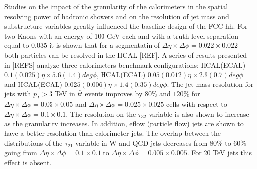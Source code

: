 Studies on the impact of the granularity of the calorimeters in the spatial resolving power of hadronic showers and on the resolution of jet mass and substructure variables greatly influenced the baseline design of the FCC-hh. For two Kaons with an energy of 100 GeV each and with a truth level separation equal to $0.035$ it is shown that for a segmentatin of $\Delta\eta\times\Delta\phi=0.022\times0.022$ both particles can be resolved in the HCAL [REF]. A series of results presented in [REFS] analyze three calorimeters benchmark configurations: HCAL(ECAL) $0.1(0.025) \eta\times5.6(1.4) deg \phi$, HCAL(ECAL) $0.05(0.012) \eta\times2.8(0.7) deg \phi$ and HCAL(ECAL) $0.025(0.006) \eta \times 1.4(0.35) deg \phi$. The jet mass resolution for jets with $p_T>3$ TeV in $t\overleftarrow{t}$ events improves by $80 \%$ and $120 \%$ for $\Delta\eta\times\Delta\phi = 0.05 \times 0.05$ and $\Delta\eta\times\Delta\phi = 0.025 \times 0.025$ cells with respect to $\Delta\eta\times\Delta\phi = 0.1\times0.1$. The resolution on the $\tau_{32}$ variable is also shown to increase as the granularity increases. In addition, eflow (particle flow) jets are shown to have a better resolution than calorimeter jets. The overlap between the distributions of the $\tau_{21}$ variable in W and QCD jets decreases from $80\%$ to $60\%$ going from $\Delta\eta\times\Delta\phi = 0.1 \times 0.1$ to $\Delta\eta\times\Delta\phi = 0.005 \times 0.005$. For $20$ TeV jets this effect is absent.



